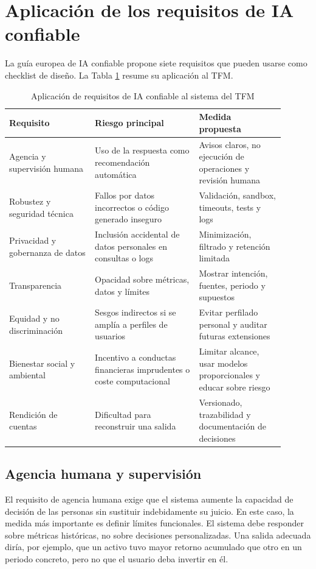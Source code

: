 \documentclass{article}
\begin{document}
\section{Aplicación de los requisitos de IA confiable}

La guía europea de IA confiable propone siete requisitos que pueden usarse como checklist de diseño. La Tabla \ref{tab:altai} resume su aplicación al TFM.

\begin{table}[h]
\centering
\caption{Aplicación de requisitos de IA confiable al sistema del TFM}
\label{tab:altai}
\small
\begin{tabular}{p{0.28\linewidth}p{0.34\linewidth}p{0.28\linewidth}}
\toprule
\textbf{Requisito} & \textbf{Riesgo principal} & \textbf{Medida propuesta} \\
\midrule
Agencia y supervisión humana & Uso de la respuesta como recomendación automática & Avisos claros, no ejecución de operaciones y revisión humana \\
Robustez y seguridad técnica & Fallos por datos incorrectos o código generado inseguro & Validación, sandbox, timeouts, tests y logs \\
Privacidad y gobernanza de datos & Inclusión accidental de datos personales en consultas o logs & Minimización, filtrado y retención limitada \\
Transparencia & Opacidad sobre métricas, datos y límites & Mostrar intención, fuentes, periodo y supuestos \\
Equidad y no discriminación & Sesgos indirectos si se amplía a perfiles de usuarios & Evitar perfilado personal y auditar futuras extensiones \\
Bienestar social y ambiental & Incentivo a conductas financieras imprudentes o coste computacional & Limitar alcance, usar modelos proporcionales y educar sobre riesgo \\
Rendición de cuentas & Dificultad para reconstruir una salida & Versionado, trazabilidad y documentación de decisiones \\
\bottomrule
\end{tabular}
\end{table}

\subsection{Agencia humana y supervisión}

El requisito de agencia humana exige que el sistema aumente la capacidad de decisión de las personas sin sustituir indebidamente su juicio. En este caso, la medida más importante es definir límites funcionales. El sistema debe responder sobre métricas históricas, no sobre decisiones personalizadas. Una salida adecuada diría, por ejemplo, que un activo tuvo mayor retorno acumulado que otro en un periodo concreto, pero no que el usuario deba invertir en él.
\end{document}
